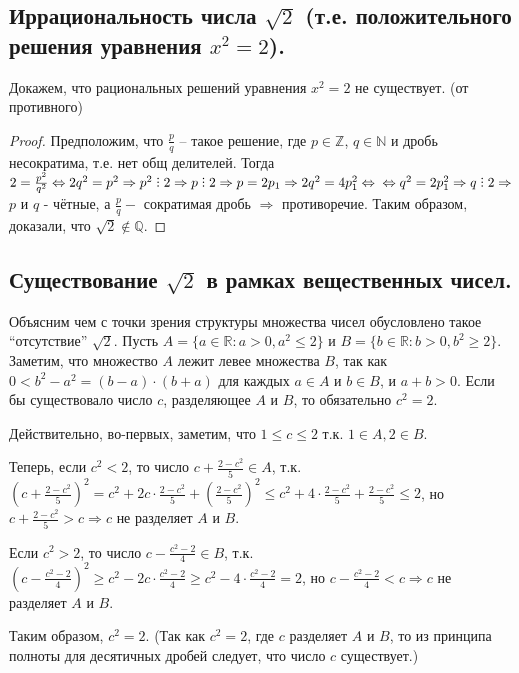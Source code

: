 \documentclass[12pt]{article}
\theoremstyle{definition}
\DeclareRobustCommand{\divby}{%
  \mathrel{\vbox{\baselineskip.65ex\lineskiplimit0pt\hbox{.}\hbox{.}\hbox{.}}}%
}
\begin{document}
\subsection{Иррациональность числа $\sqrt{2}$ (т.е. положительного решения уравнения $x^2 = 2$).}

Докажем, что рациональных решений уравнения $x^2 = 2$ не существует.  (от противного)  
\begin{proof}
Предположим, что $\frac{p}{q}$ – такое решение, где $p \in \mathbb{Z}$, $q\in\mathbb{N}$ и дробь несократима, т.е. нет общ делителей.
Тогда $2 = \frac{p^2}{q^2} \Leftrightarrow 2q^2=p^2 \Rightarrow p^2\divby2\Rightarrow p\divby2\Rightarrow p = 2p_1 \Rightarrow 2q^2 = 4p_1^2 \Leftrightarrow \newline \Leftrightarrow q^2 = 2p_1^2 \Rightarrow q \divby2 \Rightarrow $ $p$ и $q$ - чётные, а $\frac{p}{q} - $ сократимая дробь $\Rightarrow$ противоречие.
Таким образом, доказали, что $\sqrt{2} \not\in \mathbb{Q}$.
\end{proof}

\subsection{Существование $\sqrt{2}$ в рамках вещественных чисел.}

	Объясним чем с точки зрения структуры множества чисел обусловлено такое “отсутствие” $\sqrt{2}$.
Пусть $A = \{a \in \mathbb{R}: a > 0, a^2 \leq 2\}$ и $B = \{b\in\mathbb{R}: b > 0, b^2 \geq 2\}$. Заметим, что множество $A$ лежит левее множества $B$, так как $0 < b^2 - a^2 = (b-a)\cdot(b+a)$ для каждых $a \in A$ и $b \in B$, и $a + b > 0$. Если бы существовало число $c$, разделяющее $A$ и $B$, то обязательно $c^2 = 2$. 

Действительно, во-первых, заметим, что $1 \leq c \leq 2$ т.к. $1 \in A, 2 \in B$.

Теперь, если $c^2 < 2$, то число $c + \frac{2-c^2}{5} \in A$, т.к. 
$(c+\frac{2-c^2}{5})^2 = c^2 + 2c \cdot \frac{2-c^2}{5} + (\frac{2-c^2}{5})^2 \leq c^2 + 4 \cdot\frac{2-c^2}{5} + \frac{2-c^2}{5}  \leq 2$, но $c + \frac{2-c^2}{5} > c \Rightarrow c$ не разделяет $A$ и $B$.

Если  $c^2 > 2$, то число $c - \frac{c^2-2}{4} \in B$, т.к.
$(c-\frac{c^2-2}{4})^2 \geq c^2 - 2c \cdot \frac{c^2-2}{4} \geq c^2 - 4 \cdot\frac{c^2-2}{4} = 2$, но $c - \frac{c^2-2}{4} < c \Rightarrow c$ не разделяет $A$ и $B$.

Таким образом, $c^2 = 2$. (Так как $c^2 = 2$, где $c$ разделяет $A$ и $B$, то из принципа полноты для десятичных дробей следует, что число $c$ существует.)
\end{document}
